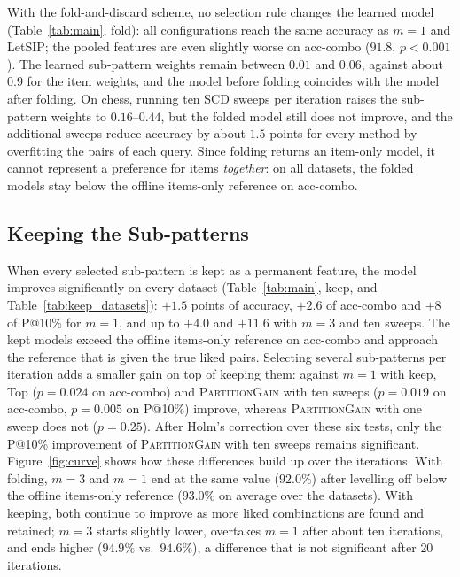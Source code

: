 \documentclass[sigconf]{acmart}
\begin{document}
With the fold-and-discard scheme, no selection rule changes the learned model (Table~\ref{tab:main}, fold): all configurations reach the same accuracy as $m = 1$ and LetSIP; the pooled features are even slightly worse on acc-combo ($91.8$, $p<0.001$). The learned sub-pattern weights remain between $0.01$ and $0.06$, against about $0.9$ for the item weights, and the model before folding
coincides with the model after folding. On chess, running ten SCD sweeps per iteration raises the sub-pattern weights to $0.16$--$0.44$, but the folded model still does not improve, and the additional sweeps reduce accuracy by about $1.5$ points for every method by overfitting the pairs of each query. Since folding returns an item-only model, it cannot represent a preference for items \emph{together}: on all datasets, the folded models stay below the offline items-only reference on acc-combo.

\subsection{Keeping the Sub-patterns}
\label{subsec:keep_results}

When every selected sub-pattern is kept as a permanent feature, the model improves significantly on every dataset (Table~\ref{tab:main}, keep, and Table~\ref{tab:keep_datasets}): $+1.5$ points of accuracy, $+2.6$ of acc-combo and $+8$ of P@10\% for $m = 1$, and up to $+4.0$ and $+11.6$ with $m = 3$ and ten sweeps. The kept models exceed the offline items-only reference on acc-combo and approach the reference that is given the true liked pairs. Selecting several sub-patterns per iteration adds a smaller gain on top of keeping them: against $m = 1$ with keep, Top ($p = 0.024$ on acc-combo) and \textsc{PartitionGain} with ten sweeps ($p = 0.019$ on acc-combo, $p = 0.005$ on P@10\%) improve, whereas \textsc{PartitionGain} with one sweep does not ($p = 0.25$). After Holm's correction over these six tests, only the P@10\% improvement of \textsc{PartitionGain} with ten sweeps remains significant. Figure~\ref{fig:curve} shows how these differences build up over the iterations. With folding, $m=3$ and $m=1$ end at the same value ($92.0\%$) after levelling off below the offline items-only reference ($93.0\%$ on average over the datasets). With keeping, both continue to improve as more liked combinations are found and retained; $m=3$ starts slightly lower, overtakes $m=1$ after about ten iterations, and ends higher ($94.9\%$ vs.\ $94.6\%$), a difference that is not significant after $20$ iterations.
\end{document}
